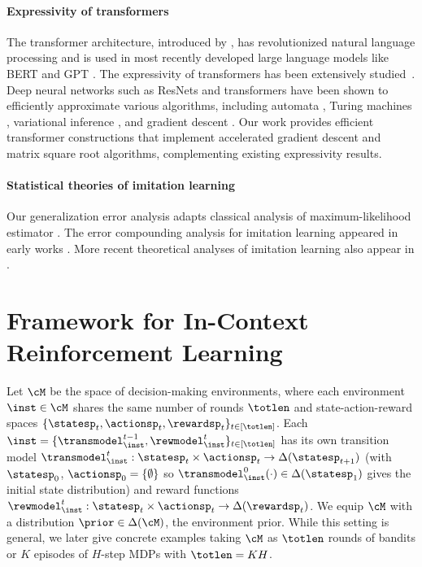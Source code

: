 \documentclass[10pt]{article}
\begin{document}
\paragraph{Expressivity of transformers} The transformer architecture, introduced by \cite{vaswani2017attention}, has revolutionized natural language processing and is used in most recently developed large language models like BERT and GPT \citep{devlin2018bert, brown2020language}. The expressivity of transformers has been extensively studied~\citep{yun2019transformers, perez2019turing, hron2020infinite,yao2021self, bhattamishra2020computational, zhang2022unveiling, liu2022transformers, wei2022statistically, fu2023can, bai2023transformers, akyurek2022learning, von2023transformers}. Deep neural networks such as ResNets and transformers have been shown to efficiently approximate various algorithms, including automata \citep{liu2022transformers}, Turing machines \citep{wei2022statistically}, variational inference \citep{mei2023deep}, and gradient descent \citep{bai2023transformers, akyurek2022learning, von2023transformers}. Our work provides efficient transformer constructions that implement accelerated gradient descent and matrix square root algorithms, complementing existing expressivity results.





\paragraph{Statistical theories of imitation learning} Our generalization error analysis adapts classical analysis of maximum-likelihood estimator \citep{geer2000empirical}. The error compounding analysis for imitation learning appeared in early works \citep{ross2011reduction, ross2010efficient}. More recent theoretical analyses of imitation learning also appear in \cite{rajaraman2020toward, rajaraman2021provably, rashidinejad2021bridging}.



\section{Framework for In-Context Reinforcement Learning}\label{sec:framework}


Let $\cM$ be the space of decision-making environments, where each environment $\inst \in \cM$ shares the same number of rounds $\totlen$ and state-action-reward spaces $\{ \statesp_t,  \actionsp_t, \rewardsp_t \}_{t \in [\totlen]}$. Each $\inst = \{\transmodel_\inst^{t-1}, \rewmodel_\inst^t \}_{t \in [\totlen]}$ has its own transition model $\transmodel_\inst^t: \statesp_{t} \times \actionsp_{t} \to \Delta(\statesp_{t+1})$ (with $\statesp_0$, $\actionsp_0 = \{ \emptyset \}$ so $\transmodel_\inst^0(\cdot) \in \Delta(\statesp_1)$ gives the initial state distribution) and reward functions $\rewmodel_\inst^{t}: \statesp_{t} \times \actionsp_{t} \to \Delta(\rewardsp_t)$. We equip $\cM$ with a distribution $\prior \in \Delta(\cM)$, the environment prior. While this setting is general, we later give concrete examples taking $\cM$ as $\totlen$ rounds of bandits or $K$ episodes of $H$-step MDPs with $\totlen = K H$.
\end{document}
